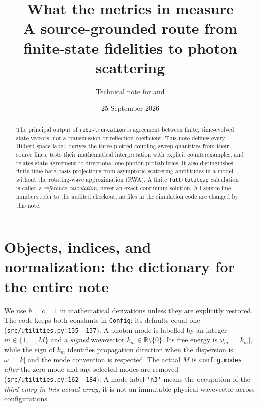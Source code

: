 \documentclass[11pt,a4paper]{article}
\title{What the metrics in \code{rabi-truncation} measure\\
\large A source-grounded route from finite-state fidelities to photon scattering}
\author{Technical note for \code{rabi-truncation} and \code{local_project}}
\date{25 September 2026}
\newcommand{\code}[1]{\nolinkurl{#1}}
\begin{document}
\maketitle
\begin{abstract}
The principal output of \code{rabi-truncation} is agreement between finite, time-evolved state vectors, not a transmission or reflection coefficient. This note defines every Hilbert-space label, derives the three plotted coupling-sweep quantities from their source lines, tests their mathematical interpretation with explicit counterexamples, and relates state agreement to directional one-photon probabilities. It also distinguishes finite-time bare-basis projections from asymptotic scattering amplitudes in a model without the rotating-wave approximation (RWA). A finite \code{full+totalcap} calculation is called a \emph{reference calculation}, never an exact continuum solution. All source line numbers refer to the audited checkout; no files in the simulation code are changed by this note.
\end{abstract}
\tableofcontents
\newpage

\section{Objects, indices, and normalization: the dictionary for the entire note}
\label{sec:dictionary}
We use $\hbar=c=1$ in mathematical derivations unless they are explicitly restored. The code keeps both constants in \code{Config}; its defaults equal one (\code{src/utilities.py:135--137}). A photon mode is labelled by an integer $m\in\{1,\ldots,M\}$ and a \emph{signed} wavevector $k_m\in\mathbb R\setminus\{0\}$. Its free energy is $\omega_m=|k_m|$, while the sign of $k_m$ identifies propagation direction when the dispersion is $\omega=|k|$ and the mode convention is respected. The actual $M$ is \code{config.modes} \emph{after} the zero mode and any selected modes are removed (\code{src/utilities.py:162--184}). A mode label \code{'n3'} means the occupation of the \emph{third entry in this actual array}; it is not an immutable physical wavevector across configurations.
\end{document}

